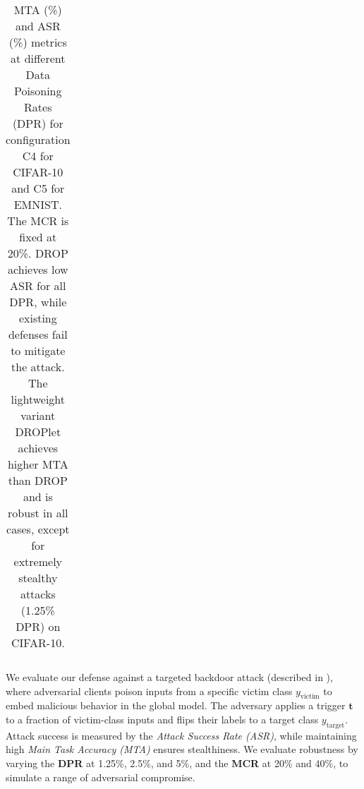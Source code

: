 \begin{table*}[th]
\begin{tabular}{l|ccc|ccc|cc|cc}
    \bottomrule
    \end{tabular}
    \caption{MTA (\%) and ASR (\%) metrics at different Data Poisoning Rates (DPR) for configuration C4 for CIFAR-10 and C5 for EMNIST. The MCR is fixed at 20\%. DROP achieves low ASR for all DPR, while existing defenses fail to mitigate the attack. The lightweight variant DROPlet achieves higher MTA than DROP and is robust in all cases, except for extremely stealthy attacks (1.25\% DPR) on CIFAR-10. }
    \label{tab:fl_vary_dpr}
\end{table*}

 We evaluate our defense against a targeted backdoor attack (described in ), where adversarial clients poison inputs from a specific victim class \(y_{\text{victim}}\) to embed malicious behavior in the global model. The adversary applies a trigger \(\mathbf{t}\) to a fraction of victim-class inputs and flips their labels to a target class \(y_{\text{target}}\). Attack success is measured by the \textit{Attack Success Rate (ASR)}, while maintaining high \textit{Main Task Accuracy (MTA)} ensures stealthiness. We evaluate robustness by varying the \textbf{DPR} at 1.25\%, 2.5\%, and 5\%, and the \textbf{MCR} at 20\% and 40\%, to simulate a range of  adversarial compromise.

